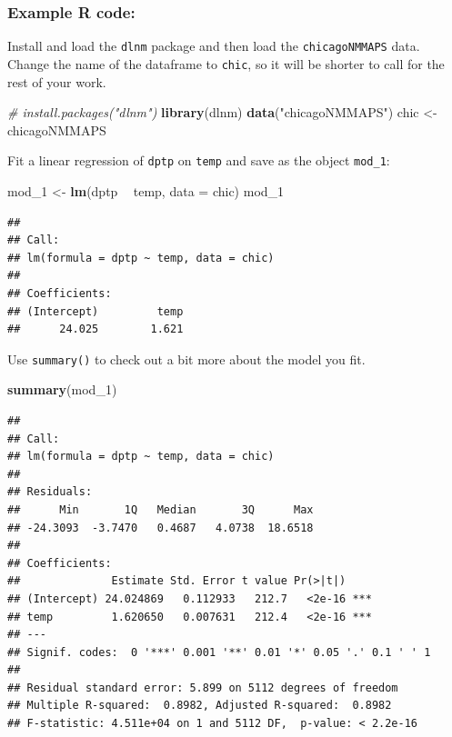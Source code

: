 \documentclass[]{book}
\makeatletter
\newenvironment{Shaded}{\begin{snugshade}}{\end{snugshade}}
\newcommand{\KeywordTok}[1]{\textcolor[rgb]{0.13,0.29,0.53}{\textbf{#1}}}
\newcommand{\DataTypeTok}[1]{\textcolor[rgb]{0.13,0.29,0.53}{#1}}
\newcommand{\DecValTok}[1]{\textcolor[rgb]{0.00,0.00,0.81}{#1}}
\newcommand{\StringTok}[1]{\textcolor[rgb]{0.31,0.60,0.02}{#1}}
\newcommand{\CommentTok}[1]{\textcolor[rgb]{0.56,0.35,0.01}{\textit{#1}}}
\newcommand{\OperatorTok}[1]{\textcolor[rgb]{0.81,0.36,0.00}{\textbf{#1}}}
\newcommand{\NormalTok}[1]{#1}
\newenvironment{kframe}{%
\medskip{}
\setlength{\fboxsep}{.8em}
 \def\at@end@of@kframe{}%
 \ifinner\ifhmode%
  \def\at@end@of@kframe{\end{minipage}}%
  \begin{minipage}{\columnwidth}%
 \fi\fi%
 \def\FrameCommand##1{\hskip\@totalleftmargin \hskip-\fboxsep
 \colorbox{shadecolor}{##1}\hskip-\fboxsep
     \hskip-\linewidth \hskip-\@totalleftmargin \hskip\columnwidth}%
 \MakeFramed {\advance\hsize-\width
   \@totalleftmargin\z@ \linewidth\hsize
   \@setminipage}}%
 {\par\unskip\endMakeFramed%
 \at@end@of@kframe}
\renewenvironment{Shaded}{\begin{kframe}}{\end{kframe}}
\theoremstyle{definition}
\theoremstyle{definition}
\theoremstyle{definition}
\theoremstyle{remark}
\makeatother
\begin{document}
\subsubsection{Example R code:}\label{example-r-code-3}

Install and load the \texttt{dlnm} package and then load the
\texttt{chicagoNMMAPS} data. Change the name of the dataframe to
\texttt{chic}, so it will be shorter to call for the rest of your work.

\begin{Shaded}
\begin{Highlighting}[]
\CommentTok{# install.packages("dlnm")}
\KeywordTok{library}\NormalTok{(dlnm)}
\KeywordTok{data}\NormalTok{(}\StringTok{"chicagoNMMAPS"}\NormalTok{)}
\NormalTok{chic <-}\StringTok{ }\NormalTok{chicagoNMMAPS}
\end{Highlighting}
\end{Shaded}

Fit a linear regression of \texttt{dptp} on \texttt{temp} and save as
the object \texttt{mod\_1}:

\begin{Shaded}
\begin{Highlighting}[]
\NormalTok{mod_}\DecValTok{1}\NormalTok{ <-}\StringTok{ }\KeywordTok{lm}\NormalTok{(dptp }\OperatorTok{~}\StringTok{ }\NormalTok{temp, }\DataTypeTok{data =}\NormalTok{ chic)}
\NormalTok{mod_}\DecValTok{1}
\end{Highlighting}
\end{Shaded}

\begin{verbatim}
## 
## Call:
## lm(formula = dptp ~ temp, data = chic)
## 
## Coefficients:
## (Intercept)         temp  
##      24.025        1.621
\end{verbatim}

Use \texttt{summary()} to check out a bit more about the model you fit.

\begin{Shaded}
\begin{Highlighting}[]
\KeywordTok{summary}\NormalTok{(mod_}\DecValTok{1}\NormalTok{)}
\end{Highlighting}
\end{Shaded}

\begin{verbatim}
## 
## Call:
## lm(formula = dptp ~ temp, data = chic)
## 
## Residuals:
##      Min       1Q   Median       3Q      Max 
## -24.3093  -3.7470   0.4687   4.0738  18.6518 
## 
## Coefficients:
##              Estimate Std. Error t value Pr(>|t|)    
## (Intercept) 24.024869   0.112933   212.7   <2e-16 ***
## temp         1.620650   0.007631   212.4   <2e-16 ***
## ---
## Signif. codes:  0 '***' 0.001 '**' 0.01 '*' 0.05 '.' 0.1 ' ' 1
## 
## Residual standard error: 5.899 on 5112 degrees of freedom
## Multiple R-squared:  0.8982, Adjusted R-squared:  0.8982 
## F-statistic: 4.511e+04 on 1 and 5112 DF,  p-value: < 2.2e-16
\end{verbatim}
\end{document}
